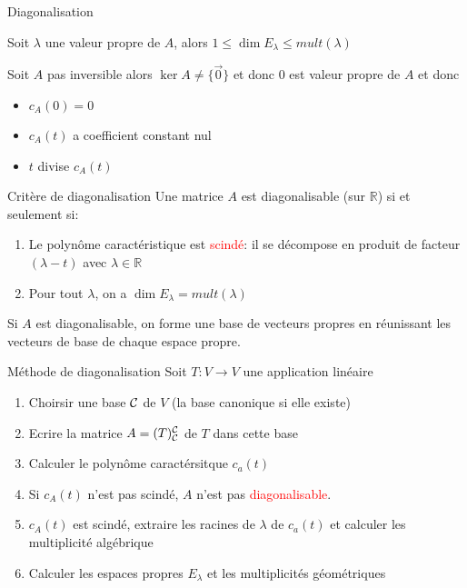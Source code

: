 \begin{parag}{Diagonalisation}
    \begin{truc}
        Soit $\lambda$ une valeur propre de $A$, alors $1 \leq \dim E_\lambda \leq mult(\lambda)$
    \end{truc}
    \begin{truc}
        Soit $A$ pas inversible alors $\ker A \neq \{\vec{0}\}$ et donc $0$ est valeur propre de $A$ et donc \\
        \begin{itemize}
            \item $c_A(0) =0$\\
            \item $c_A(t)$ a coefficient constant nul
            \item $t$ divise $c_A(t)$
        \end{itemize}
    \end{truc}
    \begin{subparag}{Critère de diagonalisation}
        Une matrice $A$ est diagonalisable (sur $\mathbb{R}$) si et seulement si:
        \begin{enumerate}
            \item Le polynôme caractéristique est \textcolor{red}{scindé}: il se décompose en produit de facteur $(\lambda - t)$ avec $\lambda \in \mathbb{R}$
            \item Pour tout $\lambda$, on a $\dim E_\lambda = mult(\lambda)$
        \end{enumerate}
        Si $A$ est diagonalisable, on forme une base de vecteurs propres en réunissant les vecteurs de base de chaque espace propre.
    \end{subparag}
    \begin{subparag}{Méthode de diagonalisation}
        Soit $T: V \to V$ une application linéaire
        \begin{enumerate}
            \item Choirsir une base $\mathcal{C}$ de $V$ (la base canonique si elle existe)
            \item Ecrire la matrice $A = (T)_{\mathcal{C}}^{\mathcal{C}}$ de $T$ dans cette base
            \item Calculer le polynôme caractérsitque $c_a(t)$
            \item Si $c_A(t)$ n'est pas scindé, $A$ n'est pas \textcolor{red}{diagonalisable}.
            \item $c_A(t)$ est scindé, extraire les racines de $\lambda$ de $c_a(t)$ et calculer les multiplicité algébrique
            \item Calculer les espaces propres $E_\lambda$ et les multiplicités géométriques

\end{enumerate}
\end{subparag}
\end{parag}
